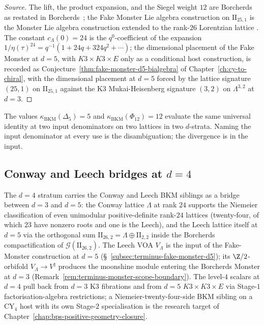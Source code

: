 \begin{proof}[Source]
The lift, the product expansion, and the Siegel weight $12$ are
Borcherds~\cite[\S~10]{Borcherds1992} as restated in
Borcherds~\cite[Example~13.7]{Borcherds1998}; the Fake Monster Lie
algebra construction on $\mathrm{II}_{25, 1}$ is the Monster Lie
algebra construction extended to the rank-$26$ Lorentzian lattice
\cite{Borcherds1990Adv}.  The constant $c_\Lambda(0) = 24$ is the
$q^0$-coefficient of the expansion $1/\eta(\tau)^{24} =
q^{-1}(1 + 24 q + 324 q^2 + \cdots)$; the dimensional placement of
the Fake Monster at \(d=5\), with \(K3\times K3\times E\) only as a
conditional host construction, is recorded as
Conjecture~\ref{thm:fake-monster-d5-bialgebra} of
Chapter~\ref{ch:cy-to-chiral}, with the dimensional placement at
$d = 5$ forced by the lattice signature $(25, 1)$ on
$\mathrm{II}_{25, 1}$ against the K3 Mukai-Heisenberg signature
$(3, 2)$ on $\Lambda^{3, 2}$ at $d = 3$.
\end{proof}

\begin{remark}
\label{rem:terminus-two-input-denominators}
The values $\kappa_{\mathrm{BKM}}(\Delta_5) = 5$ and
$\kappa_{\mathrm{BKM}}(\Phi_{12}) = 12$ evaluate the same universal
identity at two input denominators on two lattices in two
$d$-strata.  Naming the input denominator at every use is the
disambiguation; the divergence is in the input.
\end{remark}

\subsection{Conway and Leech bridges at $d = 4$}
\label{subsec:terminus-d4-bridge}

\begin{remark}
\label{rem:terminus-d4-conway-leech}
The $d = 4$ stratum carries the Conway and Leech BKM siblings as a
bridge between $d = 3$ and $d = 5$: the Conway lattice $\Lambda$ at
rank $24$ supports the Niemeier classification of even unimodular
positive-definite rank-$24$ lattices (twenty-four, of which
$23$ have nonzero roots and one is the Leech), and the Leech lattice
itself at $d = 5$ via the orthogonal sum
$\mathrm{II}_{26, 2} = \Lambda \oplus \mathrm{II}_{2, 2}$ inside the
Borcherds compactification of $\mathcal G(\mathrm{II}_{26, 2})$.
The Leech VOA $V_\Lambda$ is the input of the Fake-Monster
construction at $d = 5$
(\S~\ref{subsec:terminus-fake-monster-d5}); its $\Z/2$-orbifold
$V_\Lambda \to V^\natural$ produces the moonshine module entering
the Borcherds Monster at $d = 3$
(Remark~\ref{rem:terminus-monster-scope-boundary}).  The level-$4$ scalars at $d = 4$ pull back from $d = 3$ K3
fibrations and from $d = 5$ $K3 \times K3 \times E$ via Stage-$1$
factorisation-algebra restrictions; a Niemeier-twenty-four-side BKM
sibling on a CY$_4$ host with its own Stage-$2$ specialisation is the
research target of Chapter~\ref{chap:bps-positive-geometry-closure}.
\end{remark}

